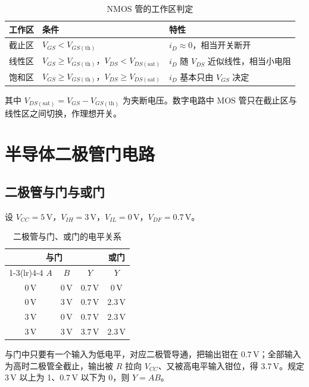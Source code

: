 \begin{table}[!htbp]
    \centering
    \caption{NMOS 管的工作区判定}
    \begin{tabular}{lll}
        \toprule
        工作区 & 条件 & 特性 \\
        \midrule
        截止区 & \(V_{GS}<V_{GS(\mathrm{th})}\) & \(i_D\approx0\)，相当开关断开 \\
        线性区 & \(V_{GS}\ge V_{GS(\mathrm{th})}\)，\(V_{DS}<V_{DS(\mathrm{sat})}\) & \(i_D\) 随 \(V_{DS}\) 近似线性，相当小电阻 \\
        饱和区 & \(V_{GS}\ge V_{GS(\mathrm{th})}\)，\(V_{DS}\ge V_{DS(\mathrm{sat})}\) & \(i_D\) 基本只由 \(V_{GS}\) 决定 \\
        \bottomrule
    \end{tabular}
\end{table}
其中 \(V_{DS(\mathrm{sat})}=V_{GS}-V_{GS(\mathrm{th})}\) 为夹断电压。数字电路中 MOS 管只在截止区与线性区之间切换，作理想开关。

\section{半导体二极管门电路}
\subsection{二极管与门与或门}
设 \(V_{CC}=5\,\mathrm{V}\)，\(V_{IH}=3\,\mathrm{V}\)，\(V_{IL}=0\,\mathrm{V}\)，\(V_{DF}=0.7\,\mathrm{V}\)。

\begin{table}[!htbp]
    \centering
    \caption{二极管与门、或门的电平关系}
    \begin{tabular}{cccc}
        \toprule
        \multicolumn{3}{c}{与门} & 或门 \\
        \cmidrule(lr){1-3}\cmidrule(lr){4-4}
        \(A\) & \(B\) & \(Y\) & \(Y\) \\
        \midrule
        \(0\,\mathrm{V}\) & \(0\,\mathrm{V}\) & \(0.7\,\mathrm{V}\) & \(0\,\mathrm{V}\) \\
        \(0\,\mathrm{V}\) & \(3\,\mathrm{V}\) & \(0.7\,\mathrm{V}\) & \(2.3\,\mathrm{V}\) \\
        \(3\,\mathrm{V}\) & \(0\,\mathrm{V}\) & \(0.7\,\mathrm{V}\) & \(2.3\,\mathrm{V}\) \\
        \(3\,\mathrm{V}\) & \(3\,\mathrm{V}\) & \(3.7\,\mathrm{V}\) & \(2.3\,\mathrm{V}\) \\
        \bottomrule
    \end{tabular}
\end{table}
与门中只要有一个输入为低电平，对应二极管导通，把输出钳在 \(0.7\,\mathrm{V}\)；全部输入为高时二极管全截止，输出被 \(R\) 拉向 \(V_{CC}\)、又被高电平输入钳位，得 \(3.7\,\mathrm{V}\)。规定 \(3\,\mathrm{V}\) 以上为 1、\(0.7\,\mathrm{V}\) 以下为 0，则 \(Y=AB\)。

